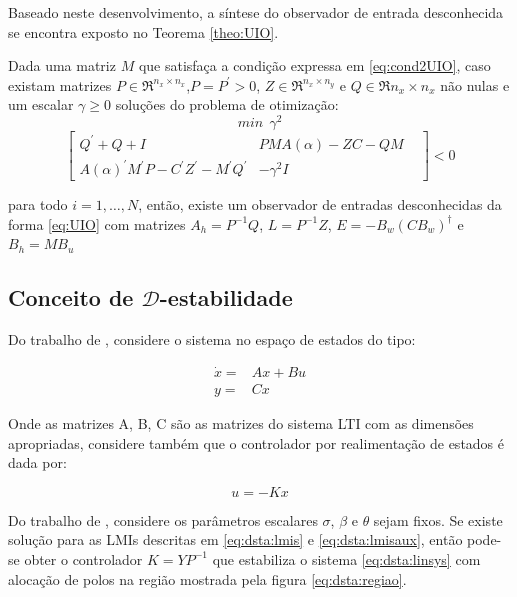 Baseado neste desenvolvimento, a síntese do observador de entrada desconhecida se encontra exposto no Teorema \ref{theo:UIO}.
\break
\begin{teorema} \label{theo:UIO}
 Dada uma matriz $M$ que satisfaça a condição expressa em \eqref{eq:cond2UIO}, caso existam matrizes $P \in \Re^{n_{x} \times n_{x}}$,$P=P^'>0$, $Z \in \Re^{n_{x} \times n_{y}}$ e $Q \in \Re{n_{x} \times n_{x}}$ não nulas e um escalar $\gamma\geq0$ soluções do problema de otimização:
 \begin{equation*}
     min \ \ \gamma^2 
 \end{equation*}
 \begin{equation}
     \begin{bmatrix}
      Q^'+Q+I& PMA(\alpha)-ZC-QM&\\ 
      A(\alpha)^'M^'P-C^'Z^'-M^'Q^'& -\gamma^2I
  \end{bmatrix} <0
 \end{equation}
\end{teorema}

para todo $i=1,\dots,N$, então, existe um observador de entradas desconhecidas da forma \eqref{eq:UIO} com matrizes $A_h=P^{-1}Q$, $L=P^{-1}Z$, $E=-B_w(CB_w)^{\dagger}$ e $B_h=MB_u$
\subsection{Conceito de \( \mathcal{D}\)-estabilidade}

Do trabalho de \cite{Chiali1996HApprocah}, considere o sistema no espaço de estados do tipo:

\begin{equation} \label{eq:dsta:linsys}
  \begin{split}
  \dot{x}=&Ax+Bu\\
     y=&Cx  
  \end{split}
\end{equation}

Onde as matrizes A, B, C são as matrizes do sistema LTI com as dimensões apropriadas, considere também que o controlador por realimentação de estados é dada por:

\begin{equation}
  u=-Kx 
\end{equation}

Do trabalho de \cite{CostaControleEolica}, considere os parâmetros escalares $\sigma$, $\beta$ e $\theta$ sejam fixos. Se existe solução para as LMIs descritas em \eqref{eq:dsta:lmis} e \eqref{eq:dsta:lmisaux}, então pode-se obter o controlador $K=YP^{-1}$ que estabiliza o sistema \eqref{eq:dsta:linsys} com alocação de polos na região mostrada pela figura \eqref{eq:dsta:regiao}.

